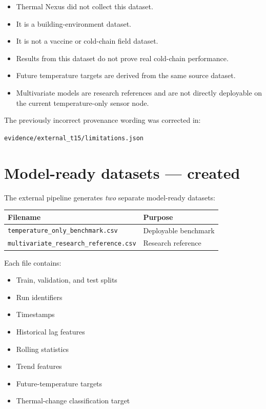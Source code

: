 \documentclass[11pt,a4paper]{article}
\begin{document}
\begin{itemize}[leftmargin=2em,itemsep=2pt]
  \item Thermal Nexus did not collect this dataset.
  \item It is a building-environment dataset.
  \item It is not a vaccine or cold-chain field dataset.
  \item Results from this dataset do not prove real cold-chain performance.
  \item Future temperature targets are derived from the same source dataset.
  \item Multivariate models are research references and are not directly
        deployable on the current temperature-only sensor node.
\end{itemize}

\noindent The previously incorrect provenance wording was corrected in:
\begin{center}
\texttt{evidence/external\_t15/limitations.json}
\end{center}

\section{Model-ready datasets --- created}

The external pipeline generates \emph{two} separate model-ready datasets:

\begin{center}
\begin{tabular}{ll}
\toprule
\textbf{Filename} & \textbf{Purpose} \\
\midrule
\texttt{temperature\_only\_benchmark.csv}        & Deployable benchmark \\
\texttt{multivariate\_research\_reference.csv}   & Research reference \\
\bottomrule
\end{tabular}
\end{center}

\noindent Each file contains:
\begin{itemize}[leftmargin=2em,itemsep=2pt]
  \item Train, validation, and test splits
  \item Run identifiers
  \item Timestamps
  \item Historical lag features
  \item Rolling statistics
  \item Trend features
  \item Future-temperature targets
  \item Thermal-change classification target
\end{itemize}
\end{document}
